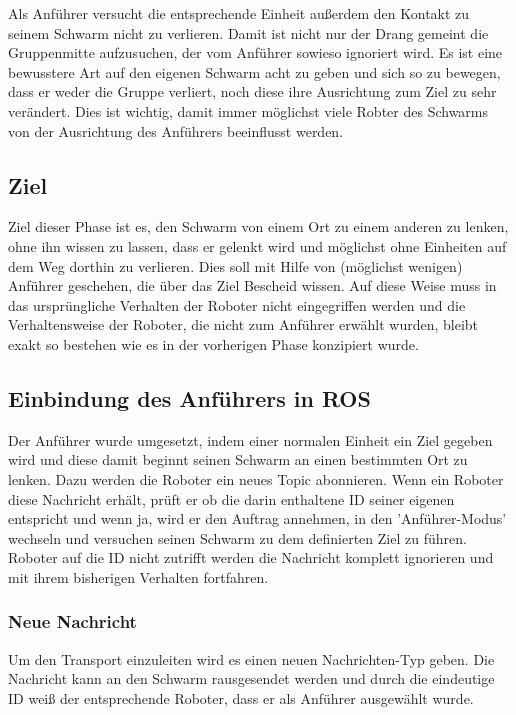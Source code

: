 Als Anführer versucht die entsprechende Einheit außerdem den Kontakt zu seinem Schwarm nicht zu verlieren. Damit ist nicht nur der Drang gemeint die Gruppenmitte aufzusuchen, der vom Anführer sowieso ignoriert wird. Es ist eine bewusstere Art auf den eigenen Schwarm acht zu geben und sich so zu bewegen, dass er weder die Gruppe verliert, noch diese ihre Ausrichtung zum Ziel zu sehr verändert. Dies ist wichtig, damit immer möglichst viele Robter des Schwarms von der Ausrichtung des Anführers beeinflusst werden.

\subsection*{Ziel}

Ziel dieser Phase ist es, den Schwarm von einem Ort zu einem anderen zu lenken, ohne ihn wissen zu lassen, dass er gelenkt wird und möglichst ohne Einheiten auf dem Weg dorthin zu verlieren. Dies soll mit Hilfe von (möglichst wenigen) Anführer geschehen, die über das Ziel Bescheid wissen. Auf diese Weise muss in das ursprüngliche Verhalten der Roboter nicht eingegriffen werden und die Verhaltensweise der Roboter, die nicht zum Anführer erwählt wurden, bleibt exakt so bestehen wie es in der vorherigen Phase konzipiert wurde.

\subsection*{Einbindung des Anführers in ROS}

Der Anführer wurde umgesetzt, indem einer normalen Einheit ein Ziel gegeben wird und diese damit beginnt seinen Schwarm an einen bestimmten Ort zu lenken. Dazu werden die Roboter ein neues Topic abonnieren. Wenn ein Roboter diese Nachricht erhält, prüft er ob die darin enthaltene ID seiner eigenen entspricht und wenn ja, wird er den Auftrag annehmen, in den 'Anführer-Modus' wechseln und versuchen seinen Schwarm zu dem definierten Ziel zu führen. Roboter auf die ID nicht zutrifft werden die Nachricht komplett ignorieren und mit ihrem bisherigen Verhalten fortfahren.

\subsubsection*{Neue Nachricht}

Um den Transport einzuleiten wird es einen neuen Nachrichten-Typ geben. Die Nachricht kann an den Schwarm rausgesendet werden und durch die eindeutige ID weiß der entsprechende Roboter, dass er als Anführer ausgewählt wurde.

